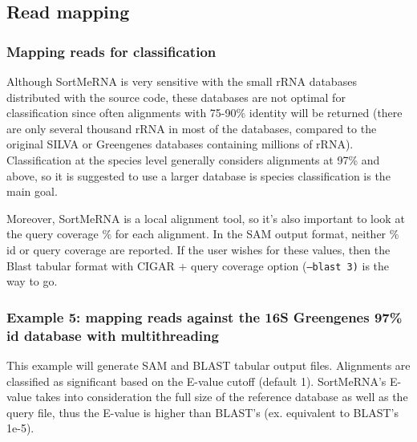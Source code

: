 \documentclass[10pt,a4paper]{article}
\begin{document}
\newpage
\subsection{Read mapping}

\subsubsection{Mapping reads for classification}

Although SortMeRNA is very sensitive with the small rRNA databases distributed with the source code,
these databases are not optimal for classification since often alignments with 75-90\% identity
will be returned (there are only several thousand rRNA in most of the databases, compared to the original
SILVA or Greengenes databases containing millions of rRNA). Classification at the species level generally
considers alignments at 97\% and above, so it is suggested to use a larger database is species classification
is the main goal.

Moreover, SortMeRNA is a local alignment tool, so it's also important to look at the query coverage \% for
each alignment. In the SAM output format, neither \% id or query coverage are reported. If the user wishes
for these values, then the Blast tabular format with CIGAR + query coverage option {(\tt--blast 3)} is the way to go.

\subsubsection{Example 5: mapping reads against the 16S Greengenes 97\% id database with multithreading}

This example will generate SAM and BLAST tabular output files. Alignments are classified as significant
based on the E-value cutoff (default 1). SortMeRNA's E-value takes into consideration the full size of the
reference database as well as the query file, thus the E-value is higher than BLAST's (ex. equivalent to BLAST's 1e-5).
\end{document}
